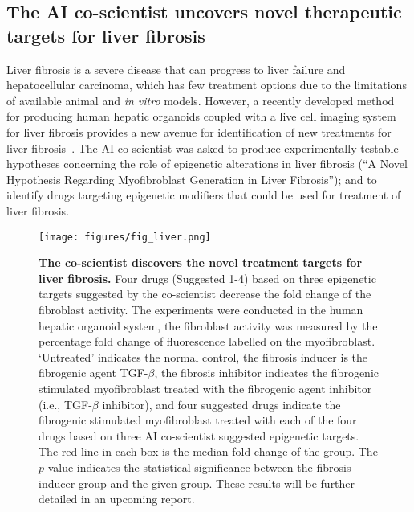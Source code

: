 \subsection{The AI co-scientist uncovers novel therapeutic targets for liver fibrosis}
\label{sec:result_liver}
Liver fibrosis is a severe disease that can progress to liver failure and hepatocellular carcinoma, which has few treatment options due to the limitations of available animal and \textit{in vitro} models. However, a recently developed method for producing human hepatic organoids coupled with a live cell imaging system for liver fibrosis provides a new avenue for identification of new treatments for liver fibrosis~\citep{guan2021human,guan2024live,guan2024hepatic}. The AI co-scientist was asked to produce experimentally testable hypotheses concerning the role of epigenetic alterations in liver fibrosis (``A Novel Hypothesis Regarding Myofibroblast Generation in Liver Fibrosis''); and to identify drugs targeting epigenetic modifiers that could be used for treatment of liver fibrosis.

\begin{figure}[ht!]
\centering
\texttt{[image: figures/fig\_liver.png]}
\vspace{0.1cm}
\caption{\textbf{The co-scientist discovers the novel treatment targets for liver fibrosis.} Four drugs (Suggested 1-4) based on three epigenetic targets suggested by the co-scientist decrease the fold change of the fibroblast activity. The experiments were conducted in the human hepatic organoid system, the fibroblast activity was measured by the percentage fold change of fluorescence labelled on the myofibroblast. `Untreated' indicates the normal control, the fibrosis inducer is the fibrogenic agent TGF-$\beta$, the fibrosis inhibitor indicates the fibrogenic stimulated myofibroblast treated with the fibrogenic agent inhibitor (i.e., TGF-$\beta$ inhibitor), and four suggested drugs indicate the fibrogenic stimulated myofibroblast treated with each of the four drugs based on three AI co-scientist suggested epigenetic targets. The red line in each box is the median fold change of the group. The $p$-value indicates the statistical significance between the fibrosis inducer group and the given group. These results will be further detailed in an upcoming report.}
\label{fig:fig_liver}
\end{figure}

